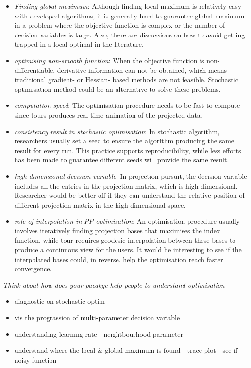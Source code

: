 \documentclass[12pt]{article}
\providecommand{\tightlist}{%
  \setlength{\itemsep}{0pt}\setlength{\parskip}{0pt}}
\begin{document}
\begin{itemize}
\item
  \emph{Finding global maximum}: Although finding local maximum is
  relatively easy with developed algorithms, it is generally hard to
  guarantee global maximum in a problem where the objective function is
  complex or the number of decision variables is large. Also, there are
  discussions on how to avoid getting trapped in a local optimal in the
  literature.
\item
  \emph{optimising non-smooth function}: When the objective function is
  non-differentiable, derivative information can not be obtained, which
  means traditional gradient- or Hessian- based methods are not
  feasible. Stochastic optimisation method could be an alternative to
  solve these problems.
\item
  \emph{computation speed}: The optimisation procedure needs to be fast
  to compute since tours produces real-time animation of the projected
  data.
\item
  \emph{consistency result in stochastic optimisation}: In stochastic
  algorithm, researchers usually set a seed to ensure the algorithm
  producing the same result for every run. This practice supports
  reproducibility, while less efforts has been made to guarantee
  different seeds will provide the same result.
\item
  \emph{high-dimensional decision variable}: In projection pursuit, the
  decision variable includes all the entries in the projection matrix,
  which is high-dimensional. Researcher would be better off if they can
  understand the relative position of different projection matrix in the
  high-dimensional space.
\item
  \emph{role of interpolation in PP optimisation}: An optimisation
  procedure usually involves iteratively finding projection bases that
  maximises the index function, while tour requires geodesic
  interpolation between these bases to produce a continuous view for the
  users. It would be interesting to see if the interpolated bases could,
  in reverse, help the optimisation reach faster convergence.
\end{itemize}

\emph{Think about how does your pacakge help people to understand
optimisation}

\begin{itemize}
\tightlist
\item
  diagnostic on stochastic optim
\item
  vis the prograssion of multi-parameter decision variable
\item
  understanding learning rate - neightbourhood parameter
\item
  understand where the local \& global maximum is found - trace plot -
  see if noisy function
\end{itemize}
\end{document}
